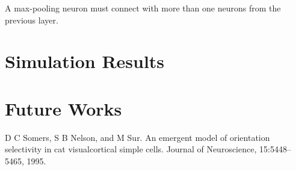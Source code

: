 \documentclass[11pt]{article}  %
\begin{document}
A max-pooling neuron must connect with more than one neurons from the previous layer. 



\section{Simulation Results}
\label{sim_res}







\section{Future Works}
\label{future_works}


\begin{thebibliography}{00}
	 D C Somers, S B Nelson, and M Sur.  An emergent model of orientation selectivity in cat visualcortical simple cells. Journal of Neuroscience, 15:5448–5465, 1995.
\end{thebibliography}
\end{document}
